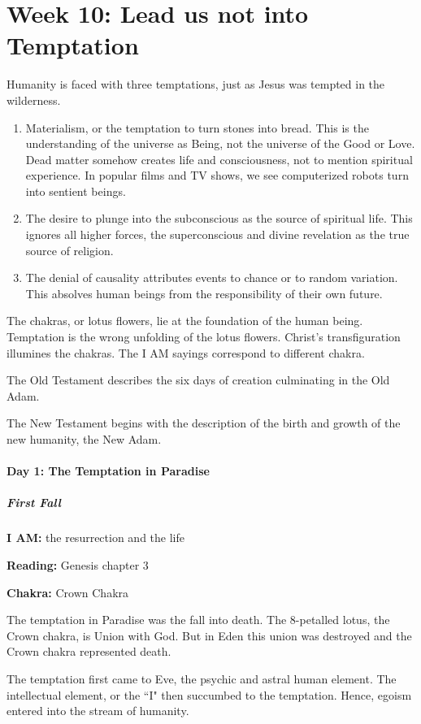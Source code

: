 \section{Week 10: Lead us not into Temptation}

Humanity is faced with three temptations, just as Jesus was tempted in the wilderness.

\begin{enumerate}
\item Materialism, or the temptation to turn stones into bread. This is the understanding of the universe as Being, not the universe of the Good or Love. Dead matter somehow creates life and consciousness, not to mention spiritual experience. In popular films and TV shows, we see computerized robots turn into sentient beings. 
\item The desire to plunge into the subconscious as the source of spiritual life. This ignores all higher forces, the superconscious and divine revelation as the true source of religion. 
\item The denial of causality attributes events to chance or to random variation. This absolves human beings from the responsibility of their own future. 
\end{enumerate}

The chakras, or lotus flowers, lie at the foundation of the human being. Temptation is the wrong unfolding of the lotus flowers. Christ's transfiguration illumines the chakras. The I AM sayings correspond to different chakra.


The Old Testament describes the six days of creation culminating in the Old Adam.

The New Testament begins with the description of the birth and growth of the new humanity, the New Adam.


\paragraph{Day 1: The Temptation in Paradise}

\subparagraph{First Fall}
\textbf{I AM:} the resurrection and the life

\textbf{Reading:} Genesis chapter 3

\textbf{Chakra:} Crown Chakra


The temptation in Paradise was the fall into death. The 8-petalled lotus, the Crown chakra, is Union with God. But in Eden this union was destroyed and the Crown chakra represented death.

The temptation first came to Eve, the psychic and astral human element. The intellectual element, or the ``I" then succumbed to the temptation. Hence, egoism entered into the stream of humanity.


